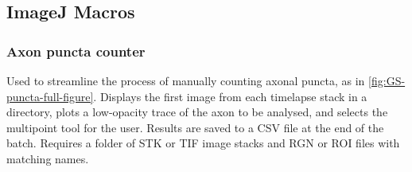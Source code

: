 \documentclass[
  12pt,
  a4paper,
]{book}
\begin{document}
\subsection{ImageJ Macros}\label{imagej-macros}

\subsubsection{Axon puncta counter}\label{axon-puncta-counter}

Used to streamline the process of manually counting axonal puncta, as in \ref{fig:GS-puncta-full-figure}. Displays the first image from each timelapse stack in a directory, plots a low-opacity trace of the axon to be analysed, and selects the multipoint tool for the user. Results are saved to a CSV file at the end of the batch. Requires a folder of STK or TIF image stacks and RGN or ROI files with matching names.
\end{document}
